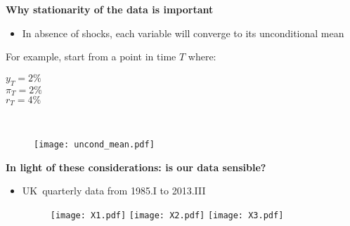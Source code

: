\documentclass[10pt,handout]{beamer}
\begin{document}
\begin{frame}
{\textbf{Why stationarity of the data is important}}

\begin{itemize}
\item In absence of shocks, {{\color{red} each variable will converge to its
unconditional mean}}\bigskip
\end{itemize}

\begin{minipage}{.25\textwidth}
For example, start from a point in time $T$ where:\\

\vspace{.05cm}

$y_{T}=2\%$ \\
$\pi_{T} =2\%$  \\
$r_{T}=4\%$
\end{minipage}\ \ \ \ \ \ \ 
\begin{minipage}{.65\textwidth}
\begin{figure}[h]
\begin{flushleft}
\texttt{[image: uncond\_mean.pdf]}
\end{flushleft}
\end{figure}
\end{minipage}
\end{frame}

\vspace{0.1cm}

\begin{frame}
{\textbf{In light of these considerations: is our data sensible?}}

\begin{itemize}
\item UK\ quarterly data from 1985.I to 2013.III\medskip\ 
\begin{figure}[h]
\centering
\texttt{[image: X1.pdf]} \texttt{[image: X2.pdf]} \texttt{[image: X3.pdf]}
\end{figure}
\end{itemize}
\end{frame}

\vspace{.1cm}
\end{document}
